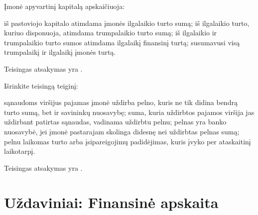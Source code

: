\begin{tasks}
  \begin{task}
    \begin{condition}
      Įmonė apyvartinį kapitalą apskaičiuoja:
      \begin{enumerate}
         iš pastoviojo kapitalo atimdama įmonės ilgalaikio turto
          sumą;
         iš ilgalaikio turto, kuriuo disponuoja, atimdama
          trumpalaikio turto sumą;
         iš ilgalaikio ir trumpalaikio turto sumos atimdama
          ilgalaikį finansinį turtą;
         susumavusi visą trumpalaikį ir ilgalaikį įmonės turtą.
      \end{enumerate}
    \end{condition}
    \begin{solution}
      Teisingas atsakymas yra .
    \end{solution}
  \end{task}

  \begin{task}
    \begin{condition}
      Išrinkite teisingą teiginį:
      \begin{enumerate}
         sąnaudoms viršijus pajamas įmonė uždirba pelno, kuris
          ne tik didina bendrą turto sumą, bet ir savininkų nuosavybę;
         suma, kuria uždirbtos pajamos viršija jas uždirbant
          patirtas sąnaudas, vadinama uždirbtu pelnu;
         pelnas yra banko nuosavybė, jei įmonė pastarajam
          skolinga didesnę nei uždirbtas pelnas sumą;
         pelnu laikomas turto arba įsipareigojimų padidėjimas,
          kuris įvyko per ataskaitinį laikotarpį.
      \end{enumerate}
    \end{condition}
    \begin{solution}
      Teisingas atsakymas yra .
    \end{solution}
  \end{task}

\end{tasks}

\chapter{Uždaviniai: Finansinė apskaita}

